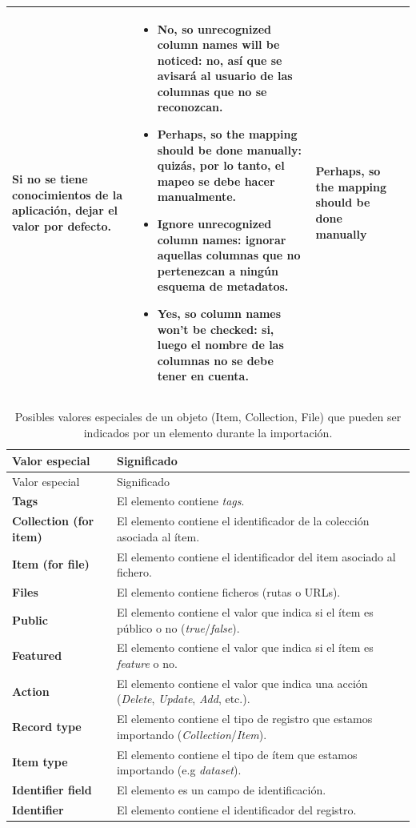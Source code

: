 \documentclass[
]{article}
\providecommand{\tightlist}{%
  \setlength{\itemsep}{0pt}\setlength{\parskip}{0pt}}
\begin{document}
\begin{longtable}[]{@{}llll@{}}
\begin{minipage}[t]{0.22\columnwidth}
\textbf{Si no se tiene conocimientos de la aplicación, dejar el valor
por defecto.}\strut
\end{minipage} & \begin{minipage}[t]{0.22\columnwidth}\raggedright
\begin{itemize}
\tightlist
\item
  \textbf{No, so unrecognized column names will be noticed}: no, así que
  se avisará al usuario de las columnas que no se reconozcan.
\item
  \textbf{Perhaps, so the mapping should be done manually}: quizás, por
  lo tanto, el mapeo se debe hacer manualmente.
\item
  \textbf{Ignore unrecognized column names}: ignorar aquellas columnas
  que no pertenezcan a ningún esquema de metadatos.
\item
  \textbf{Yes, so column names won't be checked}: si, luego el nombre de
  las columnas no se debe tener en cuenta.
\end{itemize}\strut
\end{minipage} & \begin{minipage}[t]{0.22\columnwidth}\raggedright
\textbf{Perhaps, so the mapping should be done manually}\strut
\end{minipage}\tabularnewline
\bottomrule
\end{longtable}

\begin{longtable}[]{@{}ll@{}}
\caption{Posibles valores especiales de un objeto (Item, Collection,
File) que pueden ser indicados por un elemento durante la
importación.}\tabularnewline
\toprule
Valor especial & Significado\tabularnewline
\midrule
\endfirsthead
\toprule
Valor especial & Significado\tabularnewline
\midrule
\endhead
\textbf{Tags} & El elemento contiene \emph{tags}.\tabularnewline
\textbf{Collection (for item)} & El elemento contiene el identificador
de la colección asociada al ítem.\tabularnewline
\textbf{Item (for file)} & El elemento contiene el identificador del
item asociado al fichero.\tabularnewline
\textbf{Files} & El elemento contiene ficheros (rutas o
URLs).\tabularnewline
\textbf{Public} & El elemento contiene el valor que indica si el ítem es
público o no (\emph{true}/\emph{false}).\tabularnewline
\textbf{Featured} & El elemento contiene el valor que indica si el ítem
es \emph{feature} o no.\tabularnewline
\textbf{Action} & El elemento contiene el valor que indica una acción
(\emph{Delete}, \emph{Update}, \emph{Add}, etc.).\tabularnewline
\textbf{Record type} & El elemento contiene el tipo de registro que
estamos importando (\emph{Collection}/\emph{Item}).\tabularnewline
\textbf{Item type} & El elemento contiene el tipo de ítem que estamos
importando (e.g \emph{dataset}).\tabularnewline
\textbf{Identifier field} & El elemento es un campo de
identificación.\tabularnewline
\textbf{Identifier} & El elemento contiene el identificador del
registro.\tabularnewline
\bottomrule
\end{longtable}
\end{document}

